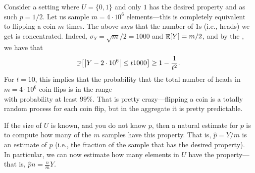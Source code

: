 \begin{example}
    Consider a setting where $U = \{ 0,1 \}$ and only $1$ has the desired
    property and as such $p=1/2$. Let us sample $m=4\cdot 10^6$ elements---this
    is completely equivalent to flipping a coin $m$ times. The above says
    that the number of $1$s (i.e., heads) we get is concentrated. Indeed,
    $\sigma_Y = \sqrt{m}/2 = 1000$ and $\mathop{\mathbb{E}}\!\left[ {Y} \right]=m/2$, and by the , we have that
    \begin{equation*}
        \Prob{ \cardin{Y - 2\cdot 10^6} \leq t 1000 }
        \geq 1 - \frac{1}{t^2}.
    \end{equation*}
    For $t=10$, this implies that the probability that the total number
    of heads in $m=4\cdot 10^6$ coin flips is in the range
    \begin{equation*}
        [2,000,000 - 10,000, 2,000,000 + 10,000]
    \end{equation*}
    with probability at least $99\%$. That is pretty crazy---flipping a
    coin is a totally random process for each coin flip, but in the
    aggregate it is pretty predictable.
\end{example}

\begin{example}
    If the size of $U$ is known, and you do not know $p$, then a natural
    estimate for $p$ is to compute how many of the $m$ samples have this
    property.  That is, $\widehat{p} = Y/m$ is an estimate of $p$ (i.e.,
    the fraction of the sample that has the desired property). In
    particular, we can now estimate how many elements in $U$ have the
    property---that is, $\widehat{p} n = \tfrac{n}{m} Y$.
\end{example}


